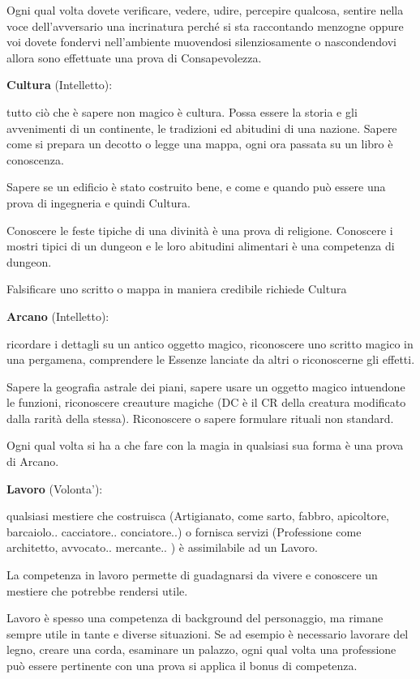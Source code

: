 \documentclass[a4paper,11pt,twoside,openany]{book}
\begin{document}
Ogni qual volta dovete verificare, vedere, udire, percepire qualcosa, sentire nella voce dell'avversario una incrinatura perché si sta raccontando menzogne oppure voi dovete fondervi nell'ambiente muovendosi silenziosamente o nascondendovi allora sono effettuate una prova di Consapevolezza.

\textbf{Cultura} (Intelletto):

tutto ciò che è sapere non magico è cultura. Possa essere la storia e gli avvenimenti di un continente, le tradizioni ed abitudini di una nazione. Sapere come si prepara un decotto o legge una mappa, ogni ora passata su un libro è conoscenza.

Sapere se un edificio è stato costruito bene, e come e quando può essere una prova di ingegneria e quindi Cultura.

Conoscere le feste tipiche di una divinità è una prova di religione. Conoscere i mostri tipici di un dungeon e le loro abitudini alimentari è una competenza di dungeon.

Falsificare uno scritto o mappa in maniera credibile richiede Cultura

\textbf{Arcano} (Intelletto):

ricordare i dettagli su un antico oggetto magico, riconoscere uno scritto magico in una pergamena, comprendere le Essenze lanciate da altri o riconoscerne gli effetti.

Sapere la geografia astrale dei piani, sapere usare un oggetto magico intuendone le funzioni, riconoscere creauture magiche (DC è il CR della creatura modificato dalla rarità della stessa). Riconoscere o sapere formulare rituali non standard.

Ogni qual volta si ha a che fare con la magia in qualsiasi sua forma è una prova di Arcano.

\textbf{Lavoro} (Volonta'):

qualsiasi mestiere che costruisca (Artigianato, come sarto, fabbro, apicoltore, barcaiolo.. cacciatore.. conciatore..) o fornisca servizi (Professione come architetto, avvocato.. mercante.. ) è assimilabile ad un Lavoro.

La competenza in lavoro permette di guadagnarsi da vivere e conoscere un mestiere che potrebbe rendersi utile.

Lavoro è spesso una competenza di background del personaggio, ma rimane sempre utile in tante e diverse situazioni. Se ad esempio è necessario lavorare del legno, creare una corda, esaminare un palazzo, ogni qual volta una professione può essere pertinente con una prova si applica il bonus di competenza.
\end{document}
